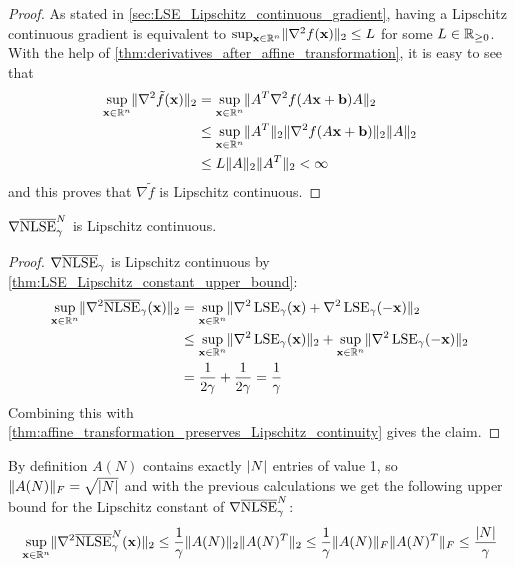 \begin{proof}
 As stated in \cref{sec:LSE_Lipschitz_continuous_gradient},
 having a Lipschitz continuous gradient is equivalent to
 \( \sup_{\mathbf{x} \in \mathbb{R}^n} \lVert\nabla^2 f(\mathbf{x})\rVert_2 \leq L \)
 for some \(L \in \mathbb{R}_{\geq 0}\).
 With the help of \cref{thm:derivatives_after_affine_transformation}, it is easy to see that
 \begin{align*}
    \sup_{\mathbf{x} \in \mathbb{R}^n} \lVert\nabla^2 \tilde{f}(\mathbf{x})\rVert_2 
  &= \sup_{\mathbf{x} \in \mathbb{R}^n} \lVert A^T \nabla^2 f(A \mathbf{x} + \mathbf{b}) A\rVert_2 \\
  &\leq \sup_{\mathbf{x} \in \mathbb{R}^n} \lVert A^T\rVert_2 \lVert\nabla^2 f(A \mathbf{x} + \mathbf{b})\rVert_2 \lVert A\rVert_2 \\
  &\leq L \lVert A\rVert_2 \lVert A^T\rVert_2 < \infty
 \end{align*}
 and this proves that \(\nabla \tilde{f}\) is Lipschitz continuous.
\end{proof}



\begin{corollary} \label{thm:NLSE_Lipschitz_constant_upper_bound}
 \(\nabla \overline{\operatorname{NLSE}}_\gamma^N\) is Lipschitz continuous.
\end{corollary}

\begin{proof}
 \(\nabla \overline{\operatorname{NLSE}}_\gamma\) is Lipschitz continuous by \cref{thm:LSE_Lipschitz_constant_upper_bound}:
 \begin{align*}
   \sup_{\mathbf{x} \in \mathbb{R}^n} \lVert\nabla^2 \overline{\operatorname{NLSE}}_\gamma(\mathbf{x})\rVert_2 
   &= \sup_{\mathbf{x} \in \mathbb{R}^n} \lVert\nabla^2 \operatorname{LSE}_\gamma(\mathbf{x}) + \nabla^2 \operatorname{LSE}_\gamma(-\mathbf{x})\rVert_2 \\
   &\leq \sup_{\mathbf{x} \in \mathbb{R}^n} \lVert\nabla^2 \operatorname{LSE}_\gamma(\mathbf{x})\rVert_2 + \sup_{\mathbf{x} \in \mathbb{R}^n} \lVert\nabla^2 \operatorname{LSE}_\gamma(-\mathbf{x})\rVert_2 \\
   &= \frac{1}{2\gamma} + \frac{1}{2 \gamma} = \frac{1}{\gamma} 
 \end{align*}
 Combining this with \cref{thm:affine_transformation_preserves_Lipschitz_continuity} gives the claim.
\end{proof}

\begin{remark}
 By definition \(A(N)\) contains exactly \(\lvert N\rvert\) entries of value 1, so \(\lVert A(N)\rVert_F = \sqrt{\lvert N\rvert}\) and
 with the previous calculations we get the following upper bound for the Lipschitz constant of \(\nabla \overline{\operatorname{NLSE}}_\gamma^N\):
 \[ \sup_{\mathbf{x} \in \mathbb{R}^n} \lVert\nabla^2 \overline{\operatorname{NLSE}}_\gamma^N(\mathbf{x})\rVert_2 \leq \frac{1}{\gamma} \lVert A(N)\rVert_2 \lVert A(N)^T\rVert_2 \leq \frac{1}{\gamma} \lVert A(N)\rVert_F \lVert A(N)^T\rVert_F \leq \frac{\lvert N\rvert}{\gamma} \]
\end{remark}
